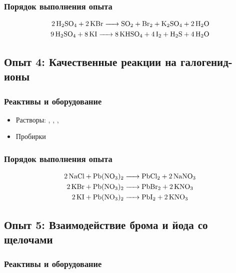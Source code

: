 \documentclass[a4paper, 12pt]{article}
\begin{document}
\subsubsection{Порядок выполнения опыта}

\begin{align}
	\ce{2H2SO4 + 2 KBr -> SO2 + Br2 + K2SO4 + 2H2O}\\
	\ce{9H2SO4 + 8 KI -> 8KHSO4 + 4 I2 + H2S + 4H2O}
\end{align}


\subsection{Опыт 4: Качественные реакции на галогенид-ионы}

\subsubsection{Реактивы и оборудование}

\begin{itemize}
	\item Растворы: , , , 
	
	\item Пробирки
\end{itemize}

\subsubsection{Порядок выполнения опыта}

\begin{align}
	\ce{2NaCl + Pb(NO3)2 &-> PbCl2 + 2 NaNO3}\\
	\ce{2KBr + Pb(NO3)2 &-> PbBr2 + 2 KNO3}\\
	\ce{2KI + Pb(NO3)2 &-> PbI2 + 2 KNO3}\\
\end{align}


\subsection{Опыт 5: Взаимодействие брома и йода со щелочами}

\subsubsection{Реактивы и оборудование}
\end{document}
